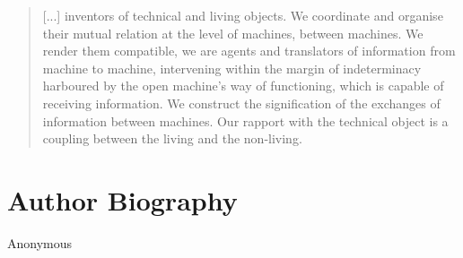 \documentclass[letterpaper]{article}
\begin{document}
    \begin{quote}
        [...] inventors of technical and living objects. We coordinate and organise their mutual relation at the level of machines, between machines. We render them compatible, we are agents and translators of information from machine to machine, intervening within the margin of indeterminacy harboured by the open machine's way of functioning, which is capable of receiving information. We construct the signification of the exchanges of information between machines. Our rapport with the technical object is a coupling between the living and the non-living. \citep[p.xvi]{SimondonOnThMdOfExstncOfTechnclObjcts1980}
    \end{quote}




\section{Author Biography}

Anonymous 
\end{document}
